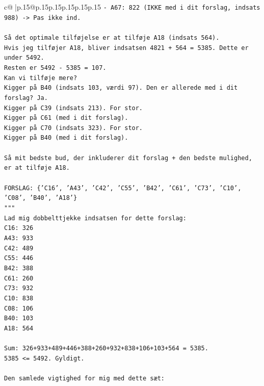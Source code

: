 \documentclass{article}
\begin{document}
{\begin{supertabular}{c@{$\;$}|p{.15\linewidth}@{}p{.15\linewidth}p{.15\linewidth}p{.15\linewidth}p{.15\linewidth}p{.15\linewidth}}
{{{\texttt{{-} A67: 822 (IKKE med i dit forslag, indsats 988) {-}> Pas ikke ind.} \\
\\ 
\texttt{Så det optimale tilføjelse er at tilføje A18 (indsats 564).} \\
\texttt{Hvis jeg tilføjer A18, bliver indsatsen 4821 + 564 = 5385. Dette er under 5492.} \\
\texttt{Resten er 5492 {-} 5385 = 107.} \\
\texttt{Kan vi tilføje mere?} \\
\texttt{Kigger på B40 (indsats 103, værdi 97). Den er allerede med i dit forslag? Ja.} \\
\texttt{Kigger på C39 (indsats 213). For stor.} \\
\texttt{Kigger på C61 (med i dit forslag).} \\
\texttt{Kigger på C70 (indsats 323). For stor.} \\
\texttt{Kigger på B40 (med i dit forslag).} \\
\\ 
\texttt{Så mit bedste bud, der inkluderer dit forslag + den bedste mulighed, er at tilføje A18.} \\
\\ 
\texttt{FORSLAG: \{'C16', 'A43', 'C42', 'C55', 'B42', 'C61', 'C73', 'C10', 'C08', 'B40', 'A18'\}} \\
\texttt{"""} \\
\texttt{Lad mig dobbelttjekke indsatsen for dette forslag:} \\
\texttt{C16: 326} \\
\texttt{A43: 933} \\
\texttt{C42: 489} \\
\texttt{C55: 446} \\
\texttt{B42: 388} \\
\texttt{C61: 260} \\
\texttt{C73: 932} \\
\texttt{C10: 838} \\
\texttt{C08: 106} \\
\texttt{B40: 103} \\
\texttt{A18: 564} \\
\\ 
\texttt{Sum: 326+933+489+446+388+260+932+838+106+103+564 = 5385.} \\
\texttt{5385 <= 5492. Gyldigt.} \\
\\ 
\texttt{Den samlede vigtighed for mig med dette sæt:} \\
}}}
\end{supertabular}}
\end{document}
